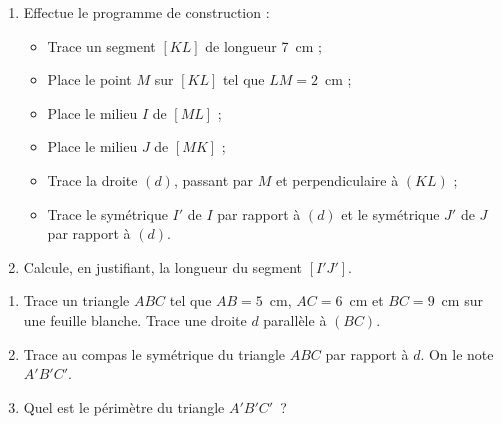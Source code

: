 \begin{exercice}
\begin{enumerate}
 \item Effectue le programme de construction :
 \begin{itemize}
  \item Trace un segment $[KL]$ de longueur 7 cm ;
  \item Place le point $M$ sur $[KL]$ tel que $LM = 2$ cm ;
  \item Place le milieu $I$ de $[ML]$ ;
  \item Place le milieu $J$ de $[MK]$ ;
  \item Trace la droite $(d)$, passant par $M$ et perpendiculaire à $(KL)$ ;
  \item Trace le symétrique $I'$ de $I$ par rapport à $(d)$ et le symétrique $J'$ de $J$ par rapport à $(d)$.
  \end{itemize}
 \item Calcule, en justifiant, la longueur du segment $[I'J']$.
 \end{enumerate}
\end{exercice}


\begin{exercice}
\begin{enumerate}
 \item Trace un triangle $ABC$ tel que $AB = 5$ cm, $AC = 6$ cm et $BC = 9$ cm sur une feuille blanche.
Trace une droite $d$ parallèle à $(BC)$.
 \item Trace au compas le symétrique du triangle $ABC$ par rapport à $d$. On le note $A'B'C'$.
 \item Quel est le périmètre du triangle $A'B'C'$ ? 
 \end{enumerate}
\end{exercice}



